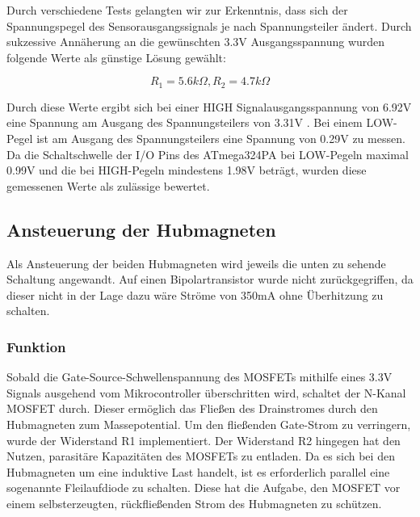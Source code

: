 Durch verschiedene Tests gelangten wir zur Erkenntnis, dass sich der Spannungspegel des Sensorausgangssignals je nach Spannungsteiler ändert.
Durch sukzessive Annäherung an die gewünschten 3.3V Ausgangsspannung wurden folgende Werte als günstige Lösung gewählt:

\begin{equation*}
    R_1 = 5.6k\Omega, R_2 = 4.7k\Omega
\end{equation*}

Durch diese Werte ergibt sich bei einer HIGH Signalausgangsspannung von 6.92V eine Spannung am Ausgang des Spannungsteilers von 3.31V .
Bei einem LOW-Pegel ist am Ausgang des Spannungsteilers eine Spannung von 0.29V zu messen.
Da die Schaltschwelle der I/O Pins des ATmega324PA bei LOW-Pegeln maximal 0.99V und die bei HIGH-Pegeln mindestens 1.98V beträgt, wurden diese gemessenen Werte als zulässige bewertet.

\newpage
\subsection{Ansteuerung der Hubmagneten}

Als Ansteuerung der beiden Hubmagneten wird jeweils die unten zu sehende Schaltung angewandt.
Auf einen Bipolartransistor wurde nicht zurückgegriffen, da dieser nicht in der Lage dazu wäre Ströme von 350mA ohne Überhitzung zu schalten.

\subsubsection{Funktion}

Sobald die Gate-Source-Schwellenspannung des MOSFETs mithilfe eines 3.3V Signals ausgehend vom Mikrocontroller überschritten wird, schaltet der N-Kanal MOSFET durch.
Dieser ermöglich das Fließen des Drainstromes durch den Hubmagneten zum Massepotential.
Um den fließenden Gate-Strom zu verringern, wurde der Widerstand R1 implementiert.
Der Widerstand R2 hingegen hat den Nutzen, parasitäre Kapazitäten des MOSFETs zu entladen.
Da es sich bei den Hubmagneten um eine induktive Last handelt, ist es erforderlich parallel eine sogenannte Fleilaufdiode zu schalten.
Diese hat die Aufgabe, den MOSFET vor einem selbsterzeugten, rückfließenden Strom des Hubmagneten zu schützen.



